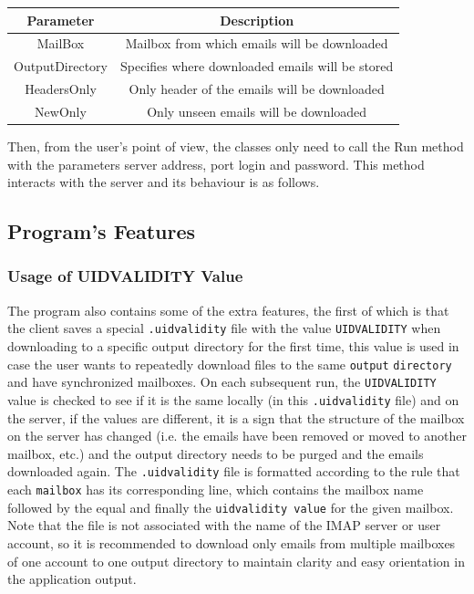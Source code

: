 \documentclass[a4paper,11pt]{article}
\begin{document}
\smallskip

\begin{center}
    \vspace{0.5cm} %
    \begin{tabular}{|c|c|}
        \hline
        \textbf{Parameter} & \textbf{Description} \\
        \hline
        MailBox & Mailbox from which emails will be downloaded \\
        \hline
        OutputDirectory & Specifies where downloaded emails will be stored \\
        \hline
        HeadersOnly & Only header of the emails will be downloaded \\
        \hline
        NewOnly & Only unseen emails will be downloaded \\
        \hline
    \end{tabular}
    \vspace{0.5cm} %
\end{center}

Then, from the user's point of view, the classes only need to call the Run method with the parameters 
server address, port login and password. This method interacts with the server and its behaviour is as follows.

\subsection{Program's Features}

\subsubsection{Usage of UIDVALIDITY Value}
The program also contains some of the extra features, the first of which is that the client 
saves a special \verb!.uidvalidity! file with the value \verb!UIDVALIDITY! when downloading 
to a specific output directory for the first time, this value is used in case the user wants 
to repeatedly download files to the same \verb!output! \verb!directory! and have synchronized mailboxes. 
On each subsequent run, the \verb!UIDVALIDITY! value is checked to see if it is the same locally 
(in this \verb!.uidvalidity! file) and on the server, if the values are different, 
it is a sign that the structure of the mailbox on the server has changed (i.e. the emails 
have been removed or moved to another mailbox, etc.) and the output directory needs to be purged 
and the emails downloaded again. 
The \verb!.uidvalidity! file is formatted according to the rule that each \verb!mailbox! has its 
corresponding line, which contains the mailbox name followed by the equal and finally the 
\verb!uidvalidity value! for the given mailbox. Note that the file is not associated with the 
name of the IMAP server or user account, so it is recommended to download only emails from 
multiple mailboxes of one account to one output directory to maintain clarity and easy orientation 
in the application output.
\end{document}
